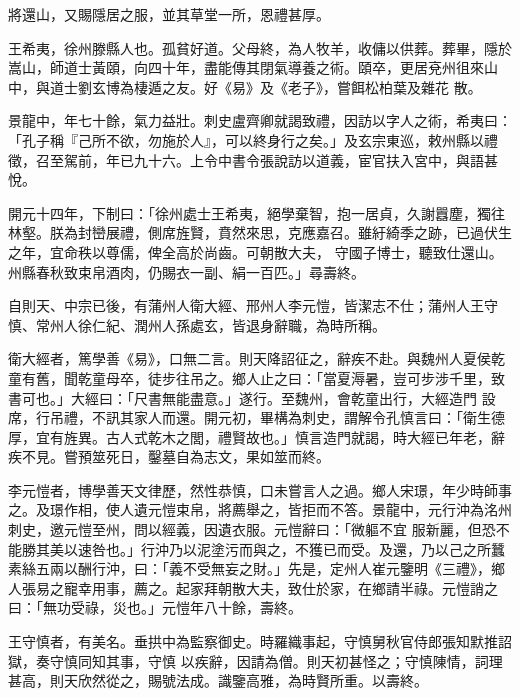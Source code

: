\begin{pinyinscope}
 將還山，又賜隱居之服，並其草堂一所，恩禮甚厚。



 王希夷，徐州滕縣人也。孤貧好道。父母終，為人牧羊，收傭以供葬。葬畢，隱於嵩山，師道士黃頤，向四十年，盡能傳其閉氣導養之術。頤卒，更居兗州徂來山中，與道士劉玄博為棲遁之友。好《易》及《老子》，嘗餌松柏葉及雜花
 散。



 景龍中，年七十餘，氣力益壯。刺史盧齊卿就謁致禮，因訪以字人之術，希夷曰：「孔子稱『己所不欲，勿施於人』，可以終身行之矣。」及玄宗東巡，敕州縣以禮徵，召至駕前，年已九十六。上令中書令張說訪以道義，宦官扶入宮中，與語甚悅。



 開元十四年，下制曰：「徐州處士王希夷，絕學棄智，抱一居貞，久謝囂塵，獨往林壑。朕為封巒展禮，側席旌賢，賁然來思，克應嘉召。雖紆綺季之跡，已過伏生之年，宜命秩以尊儒，俾全高於尚齒。可朝散大夫，
 守國子博士，聽致仕還山。州縣春秋致束帛酒肉，仍賜衣一副、絹一百匹。」尋壽終。



 自則天、中宗已後，有蒲州人衛大經、邢州人李元愷，皆潔志不仕；蒲州人王守慎、常州人徐仁紀、潤州人孫處玄，皆退身辭職，為時所稱。



 衛大經者，篤學善《易》，口無二言。則天降詔征之，辭疾不赴。與魏州人夏侯乾童有舊，聞乾童母卒，徒步往吊之。鄉人止之曰：「當夏溽暑，豈可步涉千里，致書可也。」大經曰：「尺書無能盡意。」遂行。至魏州，會乾童出行，大經造門
 設席，行吊禮，不訊其家人而還。開元初，畢構為刺史，謂解令孔慎言曰：「衛生德厚，宜有旌異。古人式乾木之閭，禮賢故也。」慎言造門就謁，時大經已年老，辭疾不見。嘗預筮死日，鑿墓自為志文，果如筮而終。



 李元愷者，博學善天文律歷，然性恭慎，口未嘗言人之過。鄉人宋璟，年少時師事之。及璟作相，使人遺元愷束帛，將薦舉之，皆拒而不答。景龍中，元行沖為洺州刺史，邀元愷至州，問以經義，因遺衣服。元愷辭曰：「微軀不宜
 服新麗，但恐不能勝其美以速咎也。」行沖乃以泥塗污而與之，不獲已而受。及還，乃以己之所蠶素絲五兩以酬行沖，曰：「義不受無妄之財。」先是，定州人崔元鑒明《三禮》，鄉人張易之寵幸用事，薦之。起家拜朝散大夫，致仕於家，在鄉請半祿。元愷誚之曰：「無功受祿，災也。」元愷年八十餘，壽終。



 王守慎者，有美名。垂拱中為監察御史。時羅織事起，守慎舅秋官侍郎張知默推詔獄，奏守慎同知其事，守慎
 以疾辭，因請為僧。則天初甚怪之；守慎陳情，詞理甚高，則天欣然從之，賜號法成。識鑒高雅，為時賢所重。以壽終。




\end{pinyinscope}
